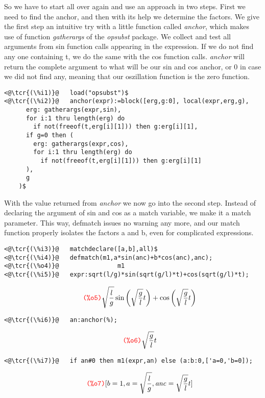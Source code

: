 \documentclass[../Maxima_Workbook.tex]{subfiles}
\begin{document}
\lz So we have to start all over again and use an approach in two steps. First we need to find the anchor, and then with its help we determine the factors. We give the first step an intuitive try with a little function called \emph{anchor}, which makes use of function \emph{gatherargs} of the \emph{opsubst} package. We collect and test all arguments from sin function calls appearing in the expression. If we do not find any one containing t, we do the same with the cos function calls. \emph{anchor} will return the complete argument to what will be our sin and cos anchor, or 0 in case we did not find any, meaning that our oszillation function is the zero function.

\lz \begin{small}
\color{blue}
\begin{lstlisting}
<@\tcr{(\%i1)}@   load("opsubst")$
<@\tcr{(\%i2)}@   anchor(expr):=block([erg,g:0], local(expr,erg,g),
	  erg: gatherargs(expr,sin),
	  for i:1 thru length(erg) do
	    if not(freeof(t,erg[i][1])) then g:erg[i][1],
	  if g=0 then (
	    erg: gatherargs(expr,cos),
	    for i:1 thru length(erg) do
	      if not(freeof(t,erg[i][1])) then g:erg[i][1]
	  ),
	  g
	)$
\end{lstlisting}
\color{black}
\end{small}

\lz With the value returned from \emph{anchor} we now go into the second step. Instead of declaring the argument of sin and cos as a match variable, we make it a match parameter. This way, defmatch issues no warning any more, and our match function properly isolates the factors a and b, even for complicated expressions.

\lz \begin{small}
\color{blue} \leqn
\begin{lstlisting}
<@\tcr{(\%i3)}@   matchdeclare([a,b],all)$
<@\tcr{(\%i4)}@   defmatch(m1,a*sin(anc)+b*cos(anc),anc);
<@\tcr{(\%o4)}@			       m1 
<@\tcr{(\%i5)}@   expr:sqrt(l/g)*sin(sqrt(g/l)*t)+cos(sqrt(g/l)*t);
\end{lstlisting}
\vspace{-4mm} \[\tag*{\tcr{\ttfamily (\%o5)}} \sqrt{\frac{l}{g}} \sin{\left( \sqrt{\frac{g}{l}} t\right) }+\cos{\left( \sqrt{\frac{g}{l}} t\right) } \]
\vspace{-6mm} \begin{lstlisting}
<@\tcr{(\%i6)}@   an:anchor(%);
\end{lstlisting}
\vspace{-5mm} \[\tag*{\tcr{\ttfamily (\%o6)}} \sqrt{\frac{g}{l}} t \]
\vspace{-6mm} \begin{lstlisting}
<@\tcr{(\%i7)}@   if an#0 then m1(expr,an) else (a:b:0,['a=0,'b=0]);
\end{lstlisting}
\vspace{-5mm} \[\tag*{\tcr{\ttfamily (\%o7)}} [b=1,a=\sqrt{\frac{l}{g}},\mathit{anc}=\sqrt{\frac{g}{l}} t] \]
\color{black} \reqn
\end{small} \vspace{-4mm}
\end{document}
